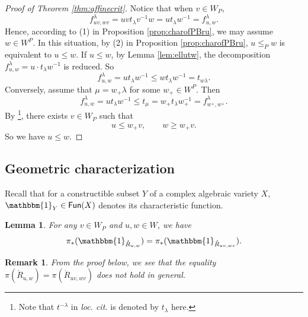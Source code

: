\documentclass[12pt]{amsart}
\newtheorem{Lemma}[Th]{Lemma}
\newtheorem{Rmk}[Th]{Remark}
\begin{document}
\begin{proof}[Proof of Theorem \ref{thm:affinecrit}]
Notice  that when $v\in W_P$, 
$$
f^\lambda_{uv,wv}=uvt_\lambda v^{-1}w = ut_\lambda w^{-1}=f^\lambda_{u,w}.$$
Hence, according to (1) in Proposition \ref{prop:charofPBru}, we may assume $w\in W^P$. In this situation, by (2) in Proposition \ref{prop:charofPBru}, $u\leq_P w$ is equivalent to $u\leq w$. 
If $u\leq w$, %
by Lemma \ref{lem:ellutw}, the decomposition $f^{\lambda}_{u,w}=u \cdot t_\lambda w^{-1}$ is reduced. So 
$$f^\lambda_{u,w}=ut_\lambda w^{-1}\leq wt_\lambda w^{-1}=t_{w\lambda}.$$
Conversely, assume that $\mu=w_+\lambda$ for some $w_+\in W^P$. 
Then 
$$f_{u,w}^\lambda = ut_\lambda w^{-1}\leq t_{\mu}= w_+ t_\lambda w_+^{-1}=f^{\lambda}_{w^+,w^+}.$$
By \cite[Proposition 2.1]{HL15}\footnote{Note that $t^{-\lambda}$ in \textit{loc. cit.} is denoted by $t_\lambda$ here.}, there exists $v\in W_P$ such that 
$$u\leq w_+v,\qquad w\geq w_+v.$$
So we have $u\leq w$.
\end{proof}













\subsection{Geometric characterization}
Recall that for a constructible subset $Y$ of a complex algebraic variety $X$, 
$\mathbbm{1}_{Y}\in \mathsf{Fun}(X)$ denotes its characteristic function. 

\begin{Lemma}\label{lem:WPinvof1uw}
For any $v\in W_P$ and $u, w\in W$, we have
$$\pi_*(\mathbbm{1}_{\mathring{R}_{u,w}})=\pi_*(\mathbbm{1}_{\mathring{R}_{uv,wv}}).$$
\end{Lemma}
\begin{Rmk}
From the proof below, we see that the equality \(\pi(\mathring{R}_{u,w})= \pi(\mathring{R}_{uv,wv})\) does not hold in general.
\end{Rmk}
\end{document}
